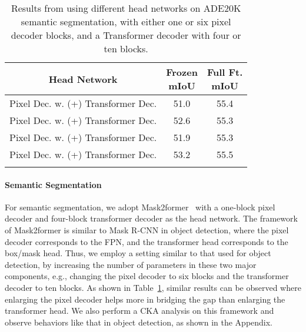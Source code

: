 \documentclass{article}
\begin{document}
\begin{table}[h]
               \centering
\addtolength{\tabcolsep}{3.0pt}
        \begin{tabular}{c|cc}
            \Xhline{1.0pt}
            Head Network& \makecell{Frozen\\mIoU} & \makecell{Full Ft.\\mIoU}\\
            \hline
             Pixel Dec. w. (+) Transformer Dec. & 51.0 & 55.4 \\
             Pixel Dec. w. (+) Transformer Dec.  & 52.6 & 55.3 \\
             Pixel Dec. w. (+) Transformer Dec. & 51.9 & 55.3 \\
             Pixel Dec. w. (+) Transformer Dec.  & 53.2 & 55.5 \\
          \Xhline{1.0pt}  
       \end{tabular}
       \caption{Results from using different head networks on ADE20K semantic segmentation, with either one or six pixel decoder blocks, and a Transformer decoder with four or ten blocks.}
    \label{tab:param_at_head_ade}
\end{table}

\paragraph{Semantic Segmentation}
For semantic segmentation, we adopt Mask2former~\cite{mask2former} with a one-block pixel decoder and four-block transformer decoder as the head network. The framework of Mask2former is similar to Mask R-CNN in object detection, where the pixel decoder corresponds to the FPN, and the transformer head corresponds to the box/mask head. Thus, we employ a setting similar to that used for object detection, by increasing the number of parameters in these two major components, e.g., changing the pixel decoder to six blocks and the transformer decoder to ten blocks. As shown in Table~\ref{tab:param_at_head_ade}, similar results can be observed where enlarging the pixel decoder helps more in bridging the gap than enlarging the transformer head. We also perform a CKA analysis on this framework and observe behaviors like that in object detection, as shown in the Appendix.
\end{document}
